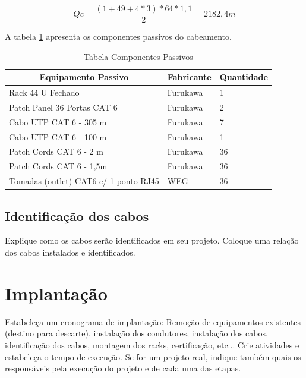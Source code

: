 \documentclass[	DIV=calc,%
							paper=a4,%
							fontsize=12pt,%
							onecolumn]{scrartcl}	 					%
\begin{document}
\begin{equation}
Qc = \frac{(1 + 49 + 4*3)*64*1,1}{2} = 2182,4 m
\end{equation}

A tabela \ref{tab:passivos} apresenta os componentes passivos do cabeamento.

\begin{table}[]
	\begin{tabular}{|l|l|l|}
		\hline
		\multicolumn{1}{|c|}{\textbf{Equipamento Passivo}} & \multicolumn{1}{c|}{\textbf{Fabricante}} & \multicolumn{1}{c|}{\textbf{Quantidade}} \\ \hline
		Rack 44 U Fechado                                  & Furukawa                                 & 1                                        \\ \hline
		Patch Panel 36 Portas CAT 6                        & Furukawa                                 & 2                                        \\ \hline
		Cabo UTP CAT 6 - 305 m                             & Furukawa                                 & 7                                        \\ \hline
		Cabo UTP CAT 6 - 100 m                             & Furukawa                                 & 1                                        \\ \hline
		Patch Cords CAT 6 - 2 m                            & Furukawa                                 & 36                                       \\ \hline
		Patch Cords CAT 6 - 1,5m                              & Furukawa                                 & 36                                       \\ \hline
		Tomadas (outlet) CAT6 c/ 1 ponto RJ45              & WEG                                      & 36                                       \\ \hline
	\end{tabular}
\caption{Tabela Componentes Passivos}
\label{tab:passivos}
\end{table}

\subsection{Identificação dos cabos}
Explique como os cabos serão identificados em seu projeto. Coloque uma relação dos cabos instalados e identificados.

\section{Implantação}
Estabeleça um cronograma de implantação:
Remoção de equipamentos existentes (destino para descarte), instalação dos condutores, instalação dos cabos, 
identificação dos cabos, montagem dos racks, certificação, etc... Crie atividades e estabeleça o tempo de execução. Se for um projeto real, indique também quais os responsáveis pela execução do projeto e de cada uma das etapas.
\end{document}
